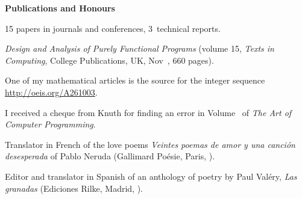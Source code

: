 \documentclass[a4paper,11pt]{article}
\begin{document}
\bigskip
\noindent\textbf{\large Publications and Honours}
\bigskip
\begin{itemize*}

  \item 15 papers in journals and conferences, 3~technical reports.

  \item \textit{Design and Analysis of Purely Functional Programs}
    (volume 15, \emph{Texts in Computing}, College Publications, UK,
    Nov~, 660 pages).

  \item One of my mathematical articles is the source for the integer
    sequence \url{http://oeis.org/A261003}.

  \item I received a cheque from Knuth for finding an error in
    Volume~ of \emph{The Art of Computer Programming}.

  \item Translator in French of the love poems \textit{Veintes poemas
    de amor y una canci\'on desesperada} of Pablo Neruda (Gallimard
    Po\'esie, Paris, ).

  \item Editor and translator in Spanish of an anthology of poetry by
    Paul Val\'ery, \emph{Las granadas} (Ediciones Rilke, Madrid,
    ).



\end{itemize*}


%
\nocite{*}
\end{document}
